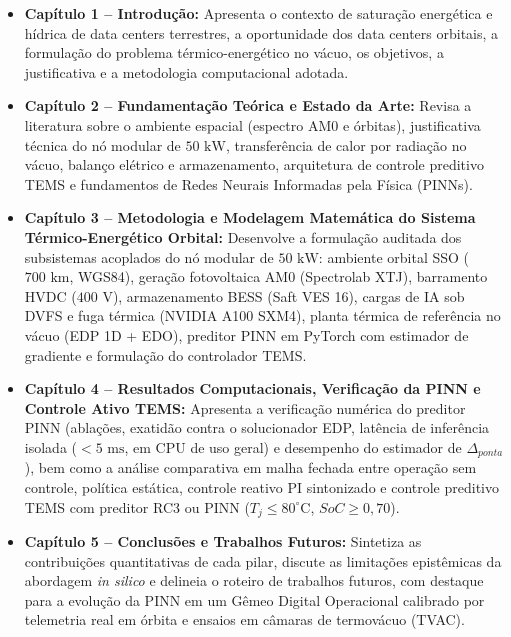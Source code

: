\begin{itemize}[leftmargin=*]
    \item \textbf{Capítulo 1 -- Introdução:} Apresenta o contexto de saturação energética e hídrica de data centers terrestres, a oportunidade dos data centers orbitais, a formulação do problema térmico-energético no vácuo, os objetivos, a justificativa e a metodologia computacional adotada.
    
    \item \textbf{Capítulo 2 -- Fundamentação Teórica e Estado da Arte:} Revisa a literatura sobre o ambiente espacial (espectro AM0 e órbitas), justificativa técnica do nó modular de $50\text{ kW}$, transferência de calor por radiação no vácuo, balanço elétrico e armazenamento, arquitetura de controle preditivo TEMS e fundamentos de Redes Neurais Informadas pela Física (PINNs).
    
    \item \textbf{Capítulo 3 -- Metodologia e Modelagem Matemática do Sistema Térmico-Energético Orbital:} Desenvolve a formulação auditada dos subsistemas acoplados do nó modular de $50\text{ kW}$: ambiente orbital SSO ($700\text{ km}$, WGS84), geração fotovoltaica AM0 (Spectrolab XTJ), barramento HVDC ($400\text{ V}$), armazenamento BESS (Saft VES 16), cargas de IA sob DVFS e fuga térmica (NVIDIA A100 SXM4), planta térmica de referência no vácuo (EDP 1D + EDO), preditor PINN em PyTorch com estimador de gradiente e formulação do controlador TEMS.
    
    \item \textbf{Capítulo 4 -- Resultados Computacionais, Verificação da PINN e Controle Ativo TEMS:} Apresenta a verificação numérica do preditor PINN (ablações, exatidão contra o solucionador EDP, latência de inferência isolada ($<5\text{ ms}$, em CPU de uso geral) e desempenho do estimador de $\Delta_{ponta}$), bem como a análise comparativa em malha fechada entre operação sem controle, política estática, controle reativo PI sintonizado e controle preditivo TEMS com preditor RC3 ou PINN ($T_j \le 80^\circ\text{C}$, $SoC \ge 0{,}70$).
    
    \item \textbf{Capítulo 5 -- Conclusões e Trabalhos Futuros:} Sintetiza as contribuições quantitativas de cada pilar, discute as limitações epistêmicas da abordagem \textit{in silico} e delineia o roteiro de trabalhos futuros, com destaque para a evolução da PINN em um Gêmeo Digital Operacional calibrado por telemetria real em órbita e ensaios em câmaras de termovácuo (TVAC).
\end{itemize}